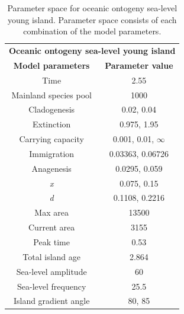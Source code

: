 \begin{table}[ht]
    \centering
    \caption{Parameter space for oceanic ontogeny sea-level young island. Parameter space consists of each combination of the model parameters.}
    \begin{tabular}{ c | c }
        \multicolumn{2}{c}{\textbf{Oceanic ontogeny sea-level young island}} \\
        \textbf{Model parameters} & \textbf{Parameter value} \\ 
        \hline
        \hline
        Time & 2.55 \\
        \hline
        Mainland species pool & 1000 \\
        \hline
        Cladogenesis & 0.02, 0.04 \\
        \hline
        Extinction & 0.975, 1.95 \\
        \hline
        Carrying capacity & 0.001, 0.01, $\infty$ \\
        \hline
        Immigration & 0.03363, 0.06726 \\
        \hline
        Anagenesis & 0.0295, 0.059 \\
        \hline
        \textit{x} & 0.075, 0.15 \\
        \hline
        \textit{d} & 0.1108, 0.2216 \\
        \hline
        Max area & 13500 \\
        \hline
        Current area & 3155 \\
        \hline
        Peak time & 0.53 \\
        \hline
        Total island age & 2.864 \\
        \hline
        Sea-level amplitude & 60 \\
        \hline
        Sea-level frequency & 25.5 \\
        \hline
        Island gradient angle & 80, 85 \\
    \end{tabular}
    \label{tab:oceanic_ontogeny_sea_level_young}
\end{table}


